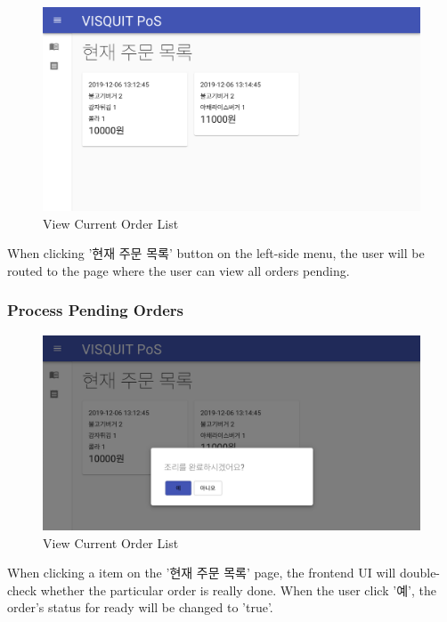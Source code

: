 \documentclass[conference,compsoc]{IEEEtran}
\begin{document}
\begin{figure}[ht!]
  \includegraphics[width=\linewidth]{figures/frontend/08-orderlist.png}
  \caption{View Current Order List}
  \label{fig:08-orderlist}
\end{figure}

When clicking '현재 주문 목록' button on the left-side menu, the user will be routed to the page where the user can view all orders pending. 

\subsubsection{Process Pending Orders}

\begin{figure}[ht!]
  \includegraphics[width=\linewidth]{figures/frontend/09-order-finish-modal.png}
  \caption{View Current Order List}
  \label{fig:09-order-finish-modal}
\end{figure}

When clicking a item on the '현재 주문 목록' page, the frontend UI will double-check whether the particular order is really done. When the user click '예', the order's status for ready will be changed to 'true'.
\end{document}

